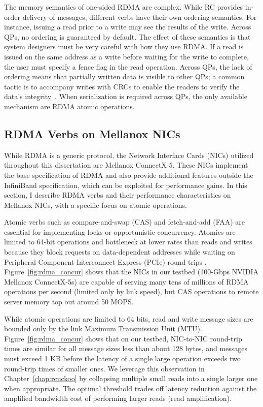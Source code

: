\documentclass[12pt]{ucsddissertation}
\begin{document}
The memory semantics of one-sided RDMA are complex. While RC provides in-order delivery of messages,
different verbs have their own ordering semantics. For instance, issuing a read prior to a write may
see the results of the write. Across QPs, no ordering is guaranteed by default. The effect of these
semantics is that system designers must be very careful with how they use RDMA. If a read is issued
on the same address as a write before waiting for the write to complete, the user must specify a
fence flag in the read operation. Across QPs, the lack of ordering means that partially written data
is visible to other QPs; a common tactic is to accompany writes with CRCs to enable the readers to
verify the data's integrity~\cite{pilaf,cell,clover,race}. When serialization is required across QPs, the only available mechanism
are RDMA atomic operations.



\subsection{RDMA Verbs on Mellanox NICs}



While RDMA is a generic protocol, the Network Interface Cards (NICs)
utilized throughout this dissertation are Mellanox ConnectX-5. These NICs implement the base
specification of RDMA and also provide additional features outside the InfiniBand specification,
which can be exploited for performance gains. In this section, I describe RDMA verbs and their
performance characteristics on Mellanox NICs, with a specific focus on atomic operations.

Atomic verbs such as compare-and-swap (CAS) and fetch-and-add (FAA) are essential for implementing
locks or opportunistic concurrency. Atomics are limited to 64-bit operations and bottleneck at lower
rates than reads and writes because they block requests on data-dependent addresses while waiting on
Peripheral Component Interconnect Express (PCIe) round trips \cite{design-guidelines,sherman}.
Figure~\ref{fig:rdma_concur} shows that the NICs in our testbed (100-Gbps NVIDIA Mellanox ConnectX-5s) are
capable of serving many tens of millions of RDMA operations per second (limited only by link speed),
but CAS operations to remote server memory top out around 50 MOPS.


While atomic operations are limited to 64 bits, read and write message sizes are bounded only by the
link Maximum Transmission Unit (MTU). Figure~\ref{fig:rdma_concur} shows that on our testbed,
NIC-to-NIC round-trip times are similar for all message sizes less than about 128 bytes, and
messages must exceed 1 KB before the latency of a single large operation exceeds two round-trip
times of smaller ones. We leverage this observation in Chapter~\ref{chap:rcuckoo} by collapsing
multiple small reads into a single larger one when appropriate. The optimal threshold trades off
latency reduction against the amplified bandwidth cost of performing larger reads (read
amplification).
\end{document}

